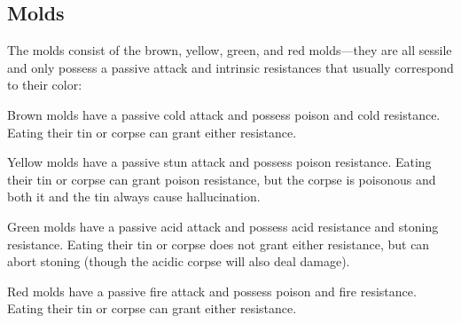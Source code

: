 \subsection{Molds}
\label{3}
The molds consist of the brown, yellow, green, and red molds{\mbox{$\text{---}$}}they are all sessile\footnotemark[31] and only possess a passive attack\footnotemark[32] and intrinsic\footnotemark[33] resistances\footnotemark[34] that usually correspond to their color:




\begin{myitemize}\item{}Brown molds have a passive cold\footnotemark[35] attack and possess poison and cold resistance\footnotemark[36]. Eating their tin or corpse can grant either resistance.
\item{}Yellow molds have a passive stun\footnotemark[37] attack and possess poison resistance. Eating their tin or corpse can grant poison resistance, but the corpse is poisonous\footnotemark[38] and both it and the tin always cause hallucination\footnotemark[39].
\item{}Green molds have a passive acid\footnotemark[40] attack and possess acid resistance\footnotemark[41] and stoning resistance\footnotemark[42]. Eating their tin or corpse does not grant either resistance, but can abort stoning\footnotemark[43] (though the acidic\footnotemark[44] corpse will also deal damage).
\item{}Red molds have a passive fire\footnotemark[45] attack and possess poison and fire resistance\footnotemark[46]. Eating their tin or corpse can grant either resistance.
\end{myitemize}

